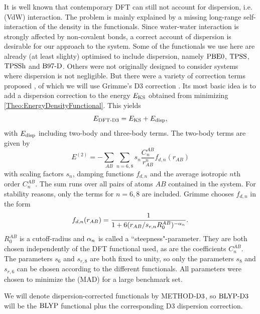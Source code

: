 \documentclass[8.5pt,twoside,twocolumn]{article}
\theoremstyle{standard}
\begin{document}
It is well known that contemporary DFT can still not account for dispersion, i.e.  (VdW)
interaction. 
The problem is mainly explained by a missing long-range self-interaction
of the density \cite{Kryachko2012} in the functionals.
Since water-water interaction is strongly affected by non-covalent bonds, a correct
account of dispersion is desirable for our approach to the system. Some of the functionals
we use here are already (at least slighty) optimised to include dispersion, namely
$\text{PBE0}$, $\text{TPSS}$, $\text{TPSSh}$ and $\text{B97-D}$. Others were not originally designed to
consider systems where dispersion is not negligible. But there were a
variety of correction terms proposed \cite{BeckeXDM2007,GrimmeDCorrection2010}, of which we will use
Grimme's D3 correction \cite{GrimmeD32011}. Its most basic idea is to add a dispersion
correction to the energy $E_{\text{KS}}$ obtained from minimizing \eqref{Theo:EnergyDensityFunctional}.
This yields
\begin{equation}
E_{\text{DFT-D3}}=E_{\text{KS}}+E_{\text{disp}},
\end{equation}  
with $E_{\text{disp}}$ including two-body and three-body terms. The two-body terms
are given by
\begin{equation}
E^{(2)}=-\sum_{AB}\sum_{n=6,8} s_n \frac {C_n^{AB}}{r_{AB}^n} f_{d,n}(r_{AB})
\end{equation}
with scaling factors $s_n$, damping functions $f_{d,n}$ and the average isotropic
$n$th order  $C_n^{AB}$. The sum runs over
all pairs of atoms $AB$ contained in the system. For stability reasons, only the terms
for $n=6,8$ are included. 
Grimme chooses $f_{d,n}$ in the form
\begin{equation}
f_{d,n}(r_{AB})=\frac 1 {1+6(r_{AB}/s_{r,n}R_0^{AB})^{-\alpha_n}}.
\end{equation}
$R_0^{AB}$ is a cutoff-radius and $\alpha_n$ is called a ``steepness"-parameter. They are both
chosen independently of the DFT functional used, as are the coefficients
$C_n^{AB}$. The parameters $s_6$ and $s_{r,8}$ are both fixed to unity, so only the parameters
$s_8$ and $s_{r,6}$ can be chosen according to the different functionals. All
parameters were chosen to minimize the  (MAD) for
a large benchmark set.

We will denote dispersion-corrected functionals by METHOD$\text{-D3}$, so $\text{BLYP}\text{-D3}$
will be the $\text{BLYP}$ functional plus the corresponding D3 dispersion correction.
\end{document}
